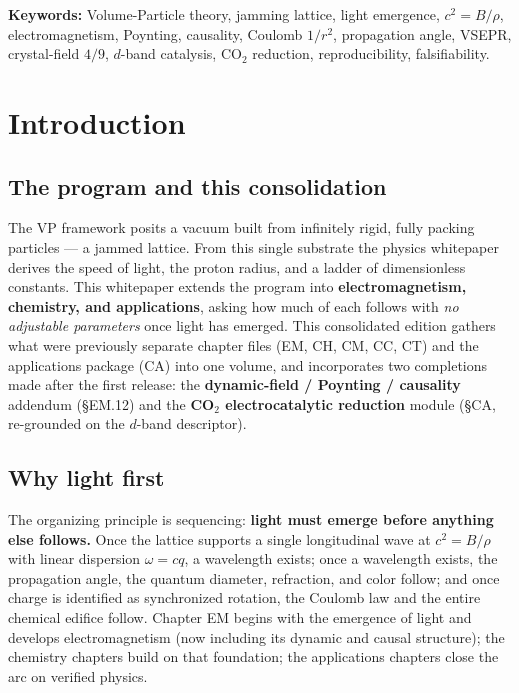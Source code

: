 \documentclass[
  10pt,
]{article}
\begin{document}
\textbf{Keywords:} Volume-Particle theory, jamming lattice, light
emergence, \(c^2=B/\rho\), electromagnetism, Poynting, causality,
Coulomb \(1/r^2\), propagation angle, VSEPR, crystal-field \(4/9\),
\(d\)-band catalysis, CO\(_2\) reduction, reproducibility,
falsifiability.

\hypertarget{introduction}{%
\section{Introduction}\label{introduction}}

\hypertarget{the-program-and-this-consolidation}{%
\subsection{The program and this
consolidation}\label{the-program-and-this-consolidation}}

The VP framework posits a vacuum built from infinitely rigid, fully
packing particles --- a jammed lattice. From this single substrate the
physics whitepaper derives the speed of light, the proton radius, and a
ladder of dimensionless constants. This whitepaper extends the program
into \textbf{electromagnetism, chemistry, and applications}, asking how
much of each follows with \emph{no adjustable parameters} once light has
emerged. This consolidated edition gathers what were previously separate
chapter files (EM, CH, CM, CC, CT) and the applications package (CA)
into one volume, and incorporates two completions made after the first
release: the \textbf{dynamic-field / Poynting / causality} addendum
(§EM.12) and the \textbf{CO\(_2\) electrocatalytic reduction} module
(§CA, re-grounded on the \(d\)-band descriptor).

\hypertarget{why-light-first}{%
\subsection{Why light first}\label{why-light-first}}

The organizing principle is sequencing: \textbf{light must emerge before
anything else follows.} Once the lattice supports a single longitudinal
wave at \(c^2 = B/\rho\) with linear dispersion \(\omega = cq\), a
wavelength exists; once a wavelength exists, the propagation angle, the
quantum diameter, refraction, and color follow; and once charge is
identified as synchronized rotation, the Coulomb law and the entire
chemical edifice follow. Chapter EM begins with the emergence of light
and develops electromagnetism (now including its dynamic and causal
structure); the chemistry chapters build on that foundation; the
applications chapters close the arc on verified physics.
\end{document}
